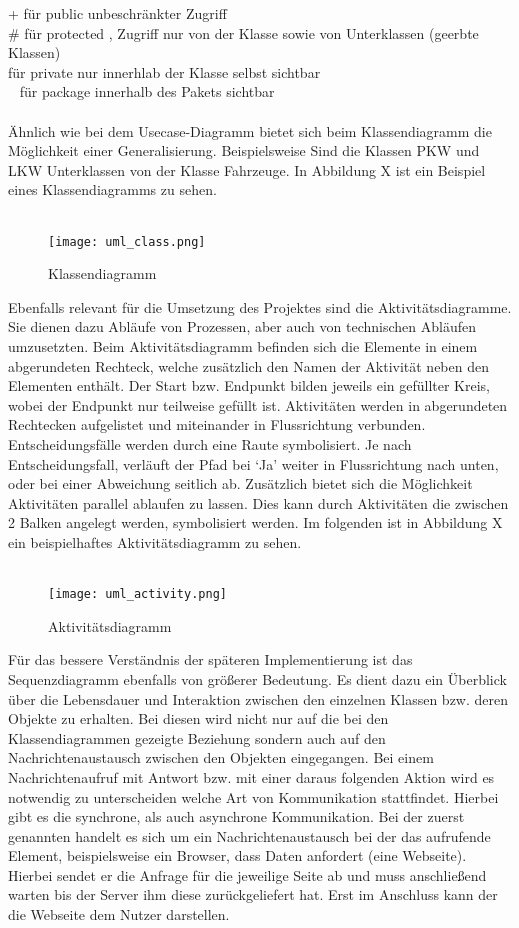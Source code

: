      + für public   unbeschränkter Zugriff\\
     \# für protected  , Zugriff nur von der Klasse sowie von Unterklassen (geerbte Klassen)\\
     \- für private  nur innerhlab der Klasse selbst sichtbar\\
     ~ für package  innerhalb des Pakets sichtbar\\
\\
Ähnlich wie bei dem Usecase-Diagramm bietet sich beim Klassendiagramm die Möglichkeit einer Generalisierung. Beispielsweise Sind die Klassen PKW und LKW Unterklassen von der Klasse Fahrzeuge. In Abbildung X ist ein Beispiel eines Klassendiagramms zu sehen.\\
\\
\begin{figure}[H]
\centering
\texttt{[image: uml\_class.png]}
\caption{Klassendiagramm}
\label{fig:show_s1_s2_p1_n1}
\end{figure}
Ebenfalls relevant für die Umsetzung des Projektes sind die Aktivitätsdiagramme. Sie dienen dazu Abläufe von Prozessen, aber auch von technischen Abläufen umzusetzten.
Beim Aktivitätsdiagramm befinden sich die Elemente in einem abgerundeten Rechteck, welche zusätzlich den Namen der Aktivität neben den Elementen enthält. Der Start bzw. Endpunkt bilden jeweils ein gefüllter Kreis, wobei der Endpunkt nur teilweise gefüllt ist. Aktivitäten werden in abgerundeten Rechtecken aufgelistet und miteinander in Flussrichtung verbunden. Entscheidungsfälle werden durch eine Raute symbolisiert. Je nach Entscheidungsfall, verläuft der Pfad bei ‘Ja’ weiter in Flussrichtung nach unten, oder bei einer Abweichung seitlich ab. Zusätzlich bietet sich die Möglichkeit Aktivitäten parallel ablaufen zu lassen. Dies kann durch Aktivitäten die zwischen 2 Balken angelegt werden, symbolisiert werden. Im folgenden ist in Abbildung X ein beispielhaftes Aktivitätsdiagramm zu sehen.\\
\\
\begin{figure}[H]
\centering
\texttt{[image: uml\_activity.png]}
\caption{Aktivitätsdiagramm}
\label{fig:show_s1_s2_p1_n1}
\end{figure}
Für das bessere Verständnis der späteren Implementierung ist das Sequenzdiagramm ebenfalls von größerer Bedeutung. Es dient dazu ein Überblick über die Lebensdauer und Interaktion zwischen den einzelnen Klassen bzw. deren Objekte zu erhalten. Bei diesen wird nicht nur auf die bei den Klassendiagrammen gezeigte Beziehung sondern auch auf den Nachrichtenaustausch zwischen den Objekten eingegangen. Bei einem Nachrichtenaufruf mit Antwort bzw. mit einer daraus folgenden Aktion wird es notwendig zu unterscheiden welche Art von Kommunikation stattfindet. Hierbei gibt es die synchrone, als auch asynchrone Kommunikation. Bei der zuerst genannten handelt es sich um ein Nachrichtenaustausch bei der das aufrufende Element, beispielsweise ein Browser, dass Daten anfordert (eine Webseite). Hierbei sendet er die Anfrage für die jeweilige Seite ab und muss anschließend warten bis der Server ihm diese zurückgeliefert hat. Erst im Anschluss kann der die Webseite dem Nutzer darstellen.
